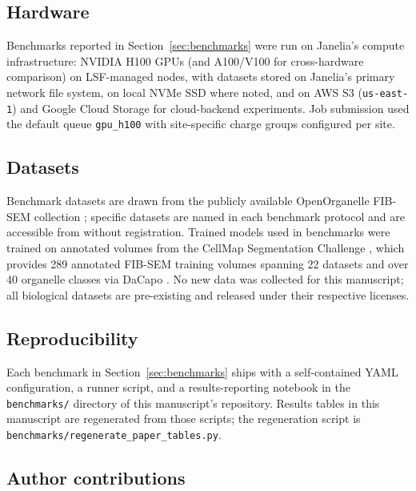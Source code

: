 \subsection*{Hardware}

Benchmarks reported in Section~\ref{sec:benchmarks} were run on Janelia's compute infrastructure: NVIDIA H100 GPUs (and A100/V100 for cross-hardware comparison) on LSF-managed nodes, with datasets stored on Janelia's primary network file system, on local NVMe SSD where noted, and on AWS S3 (\texttt{us-east-1}) and Google Cloud Storage for cloud-backend experiments. Job submission used the default queue \texttt{gpu\_h100} with site-specific charge groups configured per site.

\subsection*{Datasets}

Benchmark datasets are drawn from the publicly available OpenOrganelle FIB-SEM collection \cite{Xu2021,OpenOrganelle}; specific datasets are named in each benchmark protocol and are accessible from \openorganelle{} without registration. Trained models used in benchmarks were trained on annotated volumes from the CellMap Segmentation Challenge \cite{CellMapChallenge}, which provides 289 annotated FIB-SEM training volumes spanning 22 datasets and over 40 organelle classes via DaCapo \cite{Patton2024,DaCapoRepo}. No new data was collected for this manuscript; all biological datasets are pre-existing and released under their respective licenses.

\subsection*{Reproducibility}

Each benchmark in Section~\ref{sec:benchmarks} ships with a self-contained YAML configuration, a runner script, and a results-reporting notebook in the \texttt{benchmarks/} directory of this manuscript's repository. Results tables in this manuscript are regenerated from those scripts; the regeneration script is \texttt{benchmarks/regenerate\_paper\_tables.py}.

\subsection*{Author contributions}

